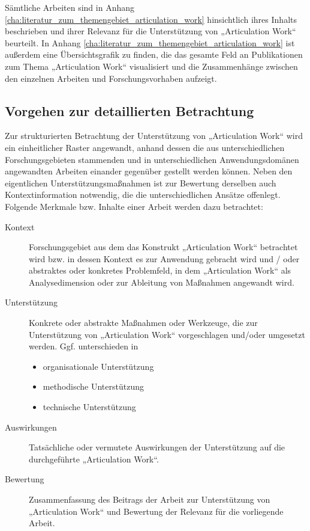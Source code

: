 Sämtliche Arbeiten sind in Anhang \ref{cha:literatur_zum_themengebiet_articulation_work} hinsichtlich ihres Inhalts beschrieben und ihrer Relevanz für die Unterstützung von „Articulation Work“ beurteilt. In Anhang \ref{cha:literatur_zum_themengebiet_articulation_work} ist außerdem eine Übersichtsgrafik zu finden, die das gesamte Feld an Publikationen zum Thema „Articulation Work“ visualisiert und die Zusammenhänge zwischen den einzelnen Arbeiten und Forschungsvorhaben aufzeigt.

\subsection{Vorgehen zur detaillierten Betrachtung} %
\label{sub:vorgehen_zur_detaillierten_betrachtung}

Zur strukturierten Betrachtung der Unterstützung von „Articulation Work“ wird ein einheitlicher Raster angewandt, anhand dessen die aus unterschiedlichen Forschungsgebieten stammenden und in unterschiedlichen Anwendungsdomänen angewandten Arbeiten einander gegenüber gestellt werden können. Neben den eigentlichen Unterstützungsmaßnahmen ist zur Bewertung derselben auch Kontextinformation notwendig, die die unterschiedlichen Ansätze offenlegt. Folgende Merkmale bzw. Inhalte einer Arbeit werden dazu betrachtet:

\begin{description}
	\item[Kontext] Forschungsgebiet aus dem das Konstrukt „Articulation Work“ betrachtet wird bzw. in dessen Kontext es zur Anwendung gebracht wird und / oder abstraktes oder konkretes Problemfeld, in dem „Articulation Work“ als Analysedimension oder zur Ableitung von Maßnahmen angewandt wird.
	\item[Unterstützung] Konkrete oder abstrakte Maßnahmen oder Werkzeuge, die zur Unterstützung von „Articulation Work“ vorgeschlagen und/oder umgesetzt werden. Ggf. unterschieden in
	\begin{itemize}
		\item organisationale Unterstützung
		\item methodische Unterstützung
		\item technische Unterstützung
	\end{itemize}
	\item[Auswirkungen] Tatsächliche oder vermutete Auswirkungen der Unterstützung auf die durchgeführte „Articulation Work“.
	\item[Bewertung] Zusammenfassung des Beitrags der Arbeit zur Unterstützung von „Articulation Work“ und Bewertung der Relevanz für die vorliegende Arbeit.
\end{description}

